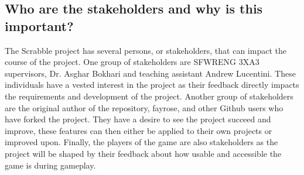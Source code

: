 \documentclass{article}
\begin{document}
\subsection*{Who are the stakeholders and why is this important?}

The Scrabble project has several persons, or stakeholders, that can impact the course of the project. One group of stakeholders are SFWRENG 3XA3 supervisors, Dr. Asghar Bokhari and teaching assistant Andrew Lucentini. These individuals have a vested interest in the project as their feedback directly impacts the requirements and development of the project. Another group of stakeholders are the original author of the repository, fayrose, and other Github users who have forked the project. They have a desire to see the project succeed and improve, these features can then either be applied to their own projects or improved upon. Finally, the players of the game are also stakeholders as the project will be shaped by their feedback about how usable and accessible the game is during gameplay.
\end{document}

